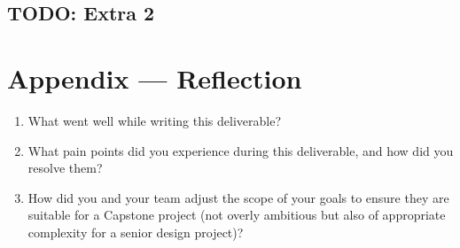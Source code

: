 \documentclass{article}
\begin{document}
\subsection{TODO: Extra 2}

\newpage{}

\section*{Appendix --- Reflection}




\begin{enumerate}
    \item What went well while writing this deliverable?
    \item What pain points did you experience during this deliverable, and how did you
          resolve them?
    \item How did you and your team adjust the scope of your goals to ensure they are
          suitable for a Capstone project (not overly ambitious but also of appropriate
          complexity for a senior design project)?
\end{enumerate}
\end{document}
